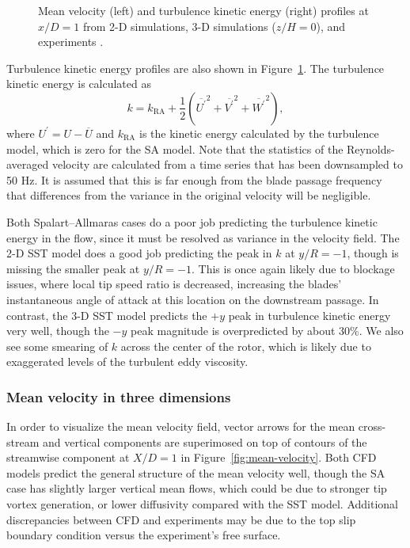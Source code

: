 \begin{figure}
    \centering


    \caption{Mean velocity (left) and turbulence kinetic energy (right) profiles
        at $x/D=1$ from 2-D simulations, 3-D simulations ($z/H=0$), and experiments
        \cite{Bachant2015-JoT}.}

    \label{fig:profiles}
\end{figure}

Turbulence kinetic energy profiles are also shown in Figure~\ref{fig:profiles}.
The turbulence kinetic energy is calculated as
\begin{equation}
k = k_{\mathrm{RA}} + \frac{1}{2} \left(
\overline{U^\prime}^2 +
\overline{V^\prime}^2 +
\overline{W^\prime}^2 \right),
\label{eq:k}
\end{equation}
where $U^\prime = U - \overline{U}$ and $k_{\mathrm{RA}}$ is the kinetic energy
calculated by the turbulence model, which is zero for the SA model. Note that
the statistics of the Reynolds-averaged velocity are calculated from a time
series that has been downsampled to 50 Hz. It is assumed that this is far enough
from the blade passage frequency that differences from the variance in the
original velocity will be negligible.

Both Spalart--Allmaras cases do a poor job predicting the turbulence kinetic
energy in the flow, since it must be resolved as variance in the velocity field.
The 2-D SST model does a good job predicting the peak in $k$ at $y/R=-1$, though
is missing the smaller peak at $y/R=-1$. This is once again likely due to
blockage issues, where local tip speed ratio is decreased, increasing the
blades' instantaneous angle of attack at this location on the downstream
passage. In contrast, the 3-D SST model predicts the $+y$ peak in turbulence
kinetic energy very well, though the $-y$ peak magnitude is overpredicted by
about 30\%. We also see some smearing of $k$ across the center of the rotor,
which is likely due to exaggerated levels of the turbulent eddy viscosity.


\subsubsection{Mean velocity in three dimensions}

In order to visualize the mean velocity field, vector arrows for the mean
cross-stream and vertical components are superimosed on top of contours of the
streamwise component at $X/D=1$ in Figure~\ref{fig:mean-velocity}. Both CFD
models predict the general structure of the mean velocity well, though the SA
case has slightly larger vertical mean flows, which could be due to stronger tip
vortex generation, or lower diffusivity compared with the SST model. Additional
discrepancies between CFD and experiments may be due to the top slip boundary
condition versus the experiment's free surface.

